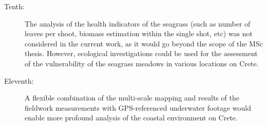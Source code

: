 \documentclass[11pt]{article}
\begin{document}
\begin{description}
		\item[Tenth:] The analysis of the health indicators of the seagrass (such as number of leaves per shoot, biomass estimation within the single shot, etc) was not considered in the current work, as it would go beyond the scope of the MSc thesis. However, ecological investigations could be used for the assessment of the vulnerability of the seagrass meadows in various locations on Crete. 
		\item[Eleventh:] A flexible combination of the multi-scale mapping and results of the fieldwork measurements with \ac{GPS}-referenced underwater footage would enable more profound analysis of the coastal environment on Crete. 
	\end{description}

\pagebreak

\end{document}
